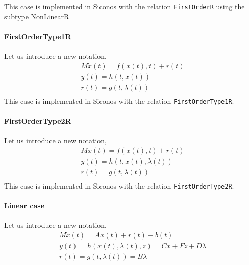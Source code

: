 This case is implemented in Siconos with the relation {\tt FirstOrderR} using the subtype {NonLinearR}

\paragraph{FirstOrderType1R}
Let us introduce a new notation,
\begin{equation}
\begin{array}{l}
M \dot{x}(t) = f(x(t),t) + r(t)  \\[2mm]
y(t) = h(t,x(t)) \\[2mm]
r(t) = g(t,\lambda (t) ) \\[2mm]
\end{array}
\label{first-DS1}
\end{equation}
This case is implemented in Siconos with the relation {\tt FirstOrderType1R}.



\paragraph{FirstOrderType2R}
Let us introduce a new notation, 
\begin{equation}
\begin{array}{l}
M \dot{x}(t) = f(x(t),t) + r(t)  \\[2mm]
y(t) = h(t,x(t),\lambda (t)) \\[2mm]
r(t) = g(t,\lambda (t) ) \\[2mm]
\end{array}
\label{first-DS2}
\end{equation}
This case is implemented in Siconos with the relation {\tt FirstOrderType2R}.




\paragraph{Linear case }Let us introduce a new notation, 
\begin{equation}
\begin{array}{l}
M \dot{x}(t) = Ax(t) + r(t)  +b(t)\\[2mm]
y(t) = h(x(t),\lambda (t),z) = Cx + Fz + D \lambda  \\[2mm]
r(t) = g(t,\lambda (t) ) = B \lambda \\[2mm]
\end{array}
\label{first-DS3}
\end{equation}


